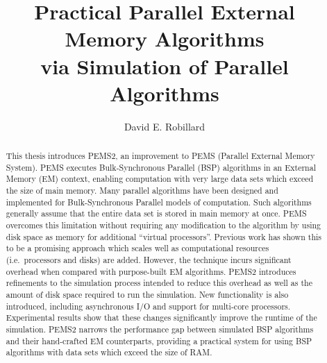 \documentclass[12pt]{carletoncsthesis}
\begin{document}
\mcs
\title{
	Practical Parallel External Memory Algorithms\\
	via Simulation of Parallel Algorithms
}
\author{David E. Robillard}


\titlepagematter


\begin{abstract}
This thesis introduces PEMS2, an improvement to PEMS (Parallel External
Memory System).  PEMS executes Bulk-Synchronous Parallel (BSP) algorithms in
an External Memory (EM) context, enabling computation with very large data
sets which exceed the size of main memory.  Many parallel algorithms have been
designed and implemented for Bulk-Synchronous Parallel models of computation.
Such algorithms generally assume that the entire data set is stored in
main memory at once.  PEMS overcomes this limitation without requiring any
modification to the algorithm by using disk space as memory for additional
``virtual processors''.  Previous work has shown this to be a promising
approach which scales well as computational resources (i.e.\ processors and
disks) are added.  However, the technique incurs significant overhead when
compared with purpose-built EM algorithms.  PEMS2 introduces refinements to
the simulation process intended to reduce this overhead as well as the amount
of disk space required to run the simulation.  New functionality is also
introduced, including asynchronous I/O and support for multi-core processors.
Experimental results show that these changes significantly improve the runtime
of the simulation.  PEMS2 narrows the performance gap between simulated BSP
algorithms and their hand-crafted EM counterparts, providing a practical
system for using BSP algorithms with data sets which exceed the size of RAM.
\end{abstract}
\end{document}
